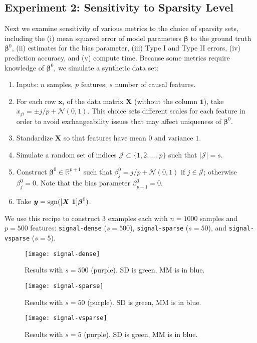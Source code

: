\documentclass[11pt]{article}
\def\sgn{\mathop{\rm sgn}\nolimits}
\newcommand{\bx}{\boldsymbol{x}}
\newcommand{\by}{\boldsymbol{y}}
\newcommand{\bX}{\boldsymbol{X}}
\newcommand{\bbeta}{\boldsymbol{\beta}}
\begin{document}
\subsection*{Experiment 2: Sensitivity to Sparsity Level}

Next we examine sensitivity of various metrics to the choice of sparsity sets, including the (i) mean squared error of model parameters $\bbeta$ to the ground truth $\bbeta^{0}$, (ii) estimates for the bias parameter, (iii) Type I and Type II errors, (iv) prediction accuracy, and (v) compute time.
Because some metrics require knowledge of $\bbeta^{0}$, we simulate a synthetic data set:
\begin{enumerate}
    \item Inputs: $n$ samples, $p$ features, $s$ number of causal features.
    \item For each row $\bx_{i}$ of the data matrix $\bX$ (without the column $\boldsymbol{1}$), take $x_{ji} = \pm j/p + \mathcal{N}(0,1)$. This choice sets different scales for each feature in order to avoid exchangeability issues that may affect uniqueness of $\bbeta^{0}$.
    \item Standardize $\bX$ so that features have mean $0$ and variance $1$.
    \item Simulate a random set of indices $\mathcal{J} \subset \{1,2,\ldots,p\}$ such that $|\mathcal{J}| = s$.
    \item Construct $\bbeta^{0} \in \mathbb{R}^{p+1}$ such that $\beta_{j}^{0} = j/p + \mathcal{N}(0,1)$ if $j \in \mathcal{J}$; otherwise $\beta_{j}^{0} = 0$. Note that the bias parameter $\beta_{p+1}^{0} = 0$.
    \item Take $\by = \sgn([\bX~\boldsymbol{1}] \bbeta^{0})$.
\end{enumerate}
We use this recipe to construct 3 examples each with $n = 1000$ samples and $p = 500$ features: \texttt{signal-dense} ($s=500$), \texttt{signal-sparse} ($s=50$), and \texttt{signal-vsparse} ($s=5$).
\begin{figure}[!ht]
    \centering
    \texttt{[image: signal-dense]}
    \caption{
        Results with $s = 500$ (purple).
        SD is green, MM is in blue.
    }
\end{figure}
\begin{figure}[!ht]
    \centering
    \texttt{[image: signal-sparse]}
    \caption{
        Results with $s = 50$ (purple).
        SD is green, MM is in blue.
    }
\end{figure}
\begin{figure}[!ht]
    \centering
    \texttt{[image: signal-vsparse]}
    \caption{
        Results with $s = 5$ (purple).
        SD is green, MM is in blue.
    }
\end{figure}
\end{document}
